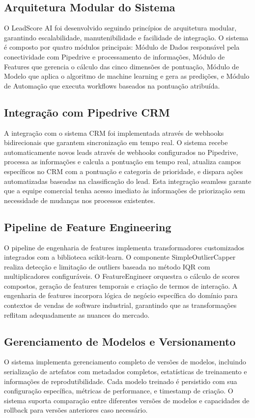 \documentclass[portuguese,11pt]{article}
\begin{document}
\begin{table}[H]
\begin{table}[H]
\begin{table}[H]
\subsection{Arquitetura Modular do Sistema}
O LeadScore AI foi desenvolvido seguindo princípios de arquitetura modular, garantindo escalabilidade, manutenibilidade e facilidade de integração. O sistema é composto por quatro módulos principais: Módulo de Dados responsável pela conectividade com Pipedrive e processamento de informações, Módulo de Features que gerencia o cálculo das cinco dimensões de pontuação, Módulo de Modelo que aplica o algoritmo de machine learning e gera as predições, e Módulo de Automação que executa workflows baseados na pontuação atribuída.

\subsection{Integração com Pipedrive CRM}
A integração com o sistema CRM foi implementada através de webhooks bidirecionais que garantem sincronização em tempo real. O sistema recebe automaticamente novos leads através de webhooks configurados no Pipedrive, processa as informações e calcula a pontuação em tempo real, atualiza campos específicos no CRM com a pontuação e categoria de prioridade, e dispara ações automatizadas baseadas na classificação do lead. Esta integração seamless garante que a equipe comercial tenha acesso imediato às informações de priorização sem necessidade de mudanças nos processos existentes.

\subsection{Pipeline de Feature Engineering}
O pipeline de engenharia de features implementa transformadores customizados integrados com a biblioteca scikit-learn. O componente SimpleOutlierCapper realiza detecção e limitação de outliers baseada no método IQR com multiplicadores configuráveis. O FeatureEngineer orquestra o cálculo de scores compostos, geração de features temporais e criação de termos de interação. A engenharia de features incorpora lógica de negócio específica do domínio para contextos de vendas de software industrial, garantindo que as transformações reflitam adequadamente as nuances do mercado.

\subsection{Gerenciamento de Modelos e Versionamento}
O sistema implementa gerenciamento completo de versões de modelos, incluindo serialização de artefatos com metadados completos, estatísticas de treinamento e informações de reprodutibilidade. Cada modelo treinado é persistido com sua configuração específica, métricas de performance, e timestamp de criação. O sistema suporta comparação entre diferentes versões de modelos e capacidades de rollback para versões anteriores caso necessário.


\end{table}
\end{table}
\end{table}
\end{document}
